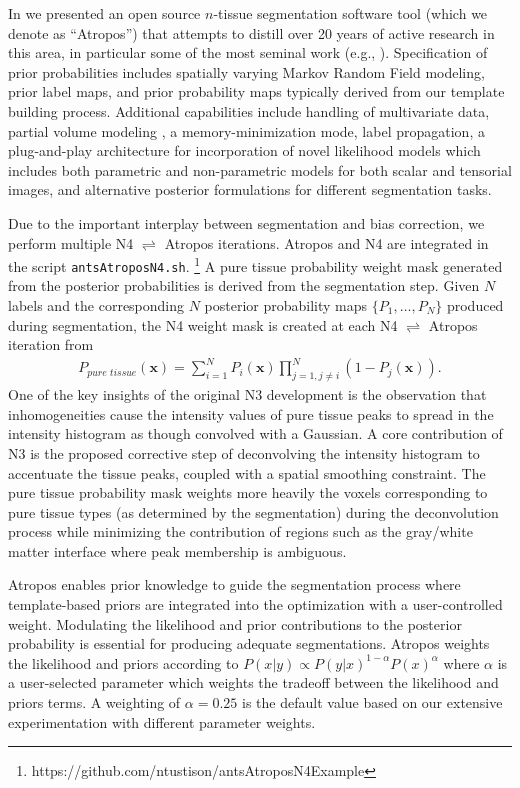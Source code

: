 In \cite{avants2011a} we presented an open source $n$-tissue segmentation software tool
(which we denote as ``Atropos'') that attempts to distill over 20 years of active research in this area,
in particular some of the most seminal work (e.g., \cite{zhang2001,ashburner2005}).
Specification of prior probabilities includes spatially varying Markov Random Field modeling, 
prior label maps, and prior probability maps typically derived from our template building 
process.  Additional
capabilities include handling of multivariate data, 
partial volume modeling \citep{shattuck2001}, a memory-minimization mode,
label propagation, a plug-and-play architecture for incorporation of novel likelihood models
which includes both parametric and non-parametric models for both scalar and tensorial
images, and alternative posterior formulations for different segmentation tasks.

Due to the important interplay between segmentation and bias correction,
we perform multiple N4 $\rightleftharpoons$ Atropos iterations.
Atropos and N4 are integrated in the script {\tt antsAtroposN4.sh}.%
\footnote{
https://github.com/ntustison/antsAtroposN4Example
}
A pure tissue probability weight mask generated from the 
posterior probabilities is derived from the segmentation 
step.  Given $N$ labels and the corresponding $N$
posterior probability maps $\{ P_1, \ldots, P_N\}$ produced
during segmentation, the N4 weight mask is 
created at each N4 $\rightleftharpoons$ Atropos iteration from
\begin{align}
  P_{pure\,\,tissue}(\mathbf{x}) = \sum_{i=1}^N P_i(\mathbf{x}) \prod_{j=1, j \neq i}^N \left( 1 - P_j(\mathbf{x}) \right).
\end{align}
One of the key insights of the original N3 development is the
observation that inhomogeneities cause the intensity values of
pure tissue peaks to spread in the intensity histogram as though
convolved with a Gaussian.  A core contribution of N3 is the
proposed corrective step of deconvolving the intensity histogram to
accentuate the tissue peaks, coupled with a spatial smoothing
constraint. The pure tissue probability mask
weights more heavily the voxels corresponding to pure tissue 
types (as determined by the segmentation) during the deconvolution process 
while minimizing the contribution of regions such as the gray/white matter 
interface where peak membership is ambiguous. 

Atropos enables prior knowledge to guide the
segmentation process where template-based priors are integrated into the optimization
with a user-controlled weight.  Modulating the likelihood and prior contributions
to the posterior probability is essential for producing adequate segmentations.
Atropos weights the likelihood and priors according to
$P(x|y) \propto P(y|x)^{1-\alpha}P(x)^{\alpha}$
where $\alpha$ is a user-selected parameter which weights the tradeoff between the likelihood and priors terms.  A weighting of $\alpha = 0.25$ is the default value based 
on our extensive experimentation with different parameter weights.


